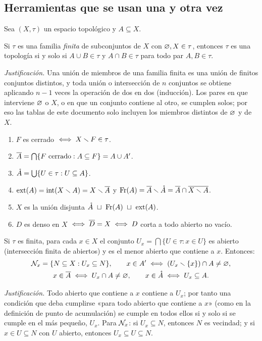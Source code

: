 \subsection{Herramientas que se usan una y otra vez}\label{sec:herr}
Sea $(X,\tau)$ un espacio topológico y $A\subseteq X$.

\begin{teorema}
Si $\tau$ es una familia \emph{finita} de subconjuntos de $X$ con $\varnothing,X\in\tau$, entonces $\tau$ es una topología
si y solo si $A\cup B\in\tau$ y $A\cap B\in\tau$ para todo par $A,B\in\tau$.
\end{teorema}
\emph{Justificación.} Una unión de miembros de una familia finita es una unión de finitos conjuntos distintos, y
toda unión o intersección de $n$ conjuntos se obtiene aplicando $n-1$ veces la operación de dos en dos (inducción).
Los pares en que interviene $\varnothing$ o $X$, o en que un conjunto contiene al otro, se cumplen solos; por eso las
tablas de este documento solo incluyen los miembros distintos de $\varnothing$ y de $X$.

\begin{teorema}
\begin{enumerate}[label=(\roman*),leftmargin=1.9em]
\item $F$ es cerrado $\iff X\smallsetminus F\in\tau$.
\item $\overline{A}=\bigcap\{F \text{ cerrado}: A\subseteq F\}=A\cup A'$.
\item $\mathring{A}=\bigcup\{U\in\tau: U\subseteq A\}$.
\item $\operatorname{ext}(A)=\operatorname{int}(X\smallsetminus A)=X\smallsetminus\overline{A}$ \quad y \quad $\operatorname{Fr}(A)=\overline{A}\smallsetminus\mathring{A}=\overline{A}\cap\overline{X\smallsetminus A}$.
\item $X$ es la unión disjunta $\inte{A}\ \sqcup\ \Fr(A)\ \sqcup\ \Ext(A)$.
\item $D$ es denso en $X$ $\iff \overline{D}=X \iff D$ corta a todo abierto no vacío.
\end{enumerate}
\end{teorema}

\begin{teorema}
Si $\tau$ es finita, para cada $x\in X$ el conjunto $U_x=\bigcap\{U\in\tau: x\in U\}$ es abierto (intersección finita
de abiertos) y es el menor abierto que contiene a $x$. Entonces:
\begin{gather*}
\mathcal{N}_x=\{N\subseteq X: U_x\subseteq N\},\qquad x\in A' \iff (U_x\smallsetminus\{x\})\cap A\neq\varnothing,\\
x\in\overline{A}\iff U_x\cap A\neq\varnothing,\qquad x\in\mathring{A}\iff U_x\subseteq A .
\end{gather*}
\end{teorema}
\emph{Justificación.} Todo abierto que contiene a $x$ contiene a $U_x$; por tanto una condición que deba cumplirse
«para todo abierto que contiene a $x$» (como en la definición de punto de acumulación) se cumple en todos ellos si y
solo si se cumple en el más pequeño, $U_x$. Para $\mathcal{N}_x$: si $U_x\subseteq N$, entonces $N$ es vecindad; y si
$x\in U\subseteq N$ con $U$ abierto, entonces $U_x\subseteq U\subseteq N$.


